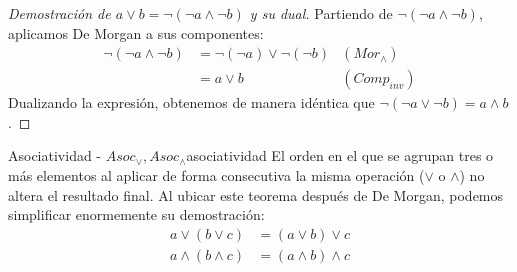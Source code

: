 {\begin{proof}[Demostración de $a \vee b = \neg (\neg a \wedge \neg b)$ y su dual]
Partiendo de $\neg (\neg a \wedge \neg b)$, aplicamos De Morgan a sus componentes:
\begin{align*}
    \neg (\neg a \wedge \neg b) &= \neg (\neg a) \vee \neg (\neg b) & (Mor_\wedge) \\
    &= a \vee b & (Comp_{inv})
\end{align*}
Dualizando la expresión, obtenemos de manera idéntica que $\neg (\neg a \vee \neg b) = a \wedge b$.
\end{proof}
}

\begin{teorema}{Asociatividad - $Asoc_\vee, Asoc_\wedge$}{asociatividad}
El orden en el que se agrupan tres o más elementos al aplicar de forma consecutiva la misma operación ($\vee$ o $\wedge$) no altera el resultado final. Al ubicar este teorema después de De Morgan, podemos simplificar enormemente su demostración:
\begin{align*}
    a \vee (b \vee c) &= (a \vee b) \vee c \\
    a \wedge (b \wedge c) &= (a \wedge b) \wedge c
\end{align*}
\end{teorema}
